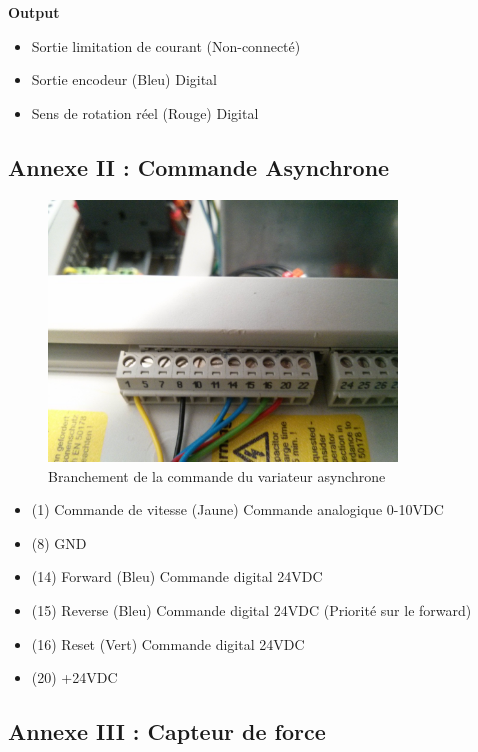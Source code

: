 \documentclass[11pt]{article}
\begin{document}
\textbf{Output}

\begin{itemize}
	\item Sortie limitation de courant (Non-connecté)
	\item Sortie encodeur (Bleu) Digital
	\item Sens de rotation réel (Rouge) Digital
\end{itemize}

\newpage

\subsection{Annexe II : Commande Asynchrone}

\begin{figure}[!h]
    \centering
    \includegraphics[width=350px]{IMG_20160629_193715.jpg}
    \caption{Branchement de la commande du variateur asynchrone}
\end{figure}

\begin{itemize}
	\item (1) Commande de vitesse (Jaune) Commande analogique 0-10VDC
	\item (8) GND
	\item (14) Forward (Bleu) Commande digital 24VDC
	\item (15) Reverse (Bleu) Commande digital 24VDC (Priorité sur le forward)
	\item (16) Reset (Vert) Commande digital 24VDC
	\item (20) +24VDC
\end{itemize}

\newpage

\subsection{Annexe III : Capteur de force}
\end{document}
